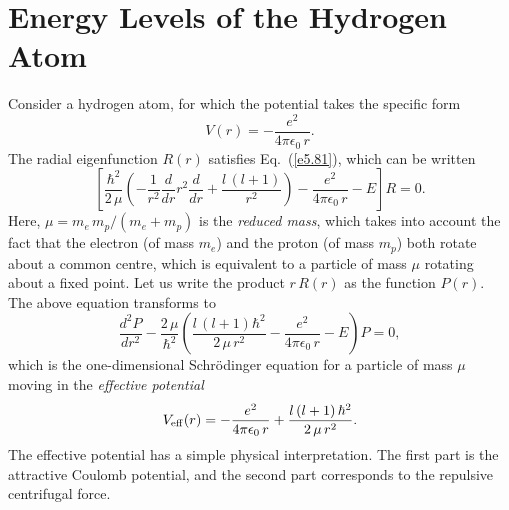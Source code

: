 \section{Energy Levels of the Hydrogen Atom}\label{s5.6}
Consider a hydrogen atom, for which the potential takes the specific form
\begin{equation}
V(r) = -\frac{e^2}{4\pi\epsilon_0\,r}.
\end{equation}
The radial eigenfunction $R(r)$ satisfies Eq.~(\ref{e5.81}), which can be written
\begin{equation}
\left[\frac{\hbar^2}{2\,\mu} \left(-\frac{1}{r^2} \frac{d}{dr}r^2\frac{d}{dr}
+\frac{l\,(l+1)}{r^2}\right)   -\frac{e^2}{4\pi\epsilon_0\,r}- E\right] R = 0.
\end{equation}
Here, $\mu = m_e \,m_p/(m_e+ m_p)$ is the {\em reduced mass}, which takes into
account the fact that the electron (of mass $m_e$) and the proton (of mass $m_p$)
both rotate about a common centre, which is equivalent to a particle of
mass $\mu$ rotating about a fixed point. Let us write the product $r\, R(r)$
as the function $P(r)$. The above equation transforms to
\begin{equation}\label{e5.84}
\frac{d^2 P}{d r^2} - \frac{2\,\mu}{\hbar^2}\left(
\frac{l\,(l+1)\hbar^2}{2\,\mu \,r^2} - \frac{e^2}{4\pi \epsilon_0 \,r}-E\right) P =0,
\end{equation}
which is the one-dimensional Schr\"{o}dinger equation for a particle of
mass $\mu$ moving in the {\em effective potential}
\begin{equation}
V_{\rm eff}(r) = -\frac{e^2}{4\pi \epsilon_0 \,r} + \frac{l\,(l+1)\,\hbar^2}{2\,\mu\, r^2}.
\end{equation}
The effective potential has a simple physical interpretation. The first part is the
attractive Coulomb potential, and the second part corresponds
to the repulsive centrifugal force.

